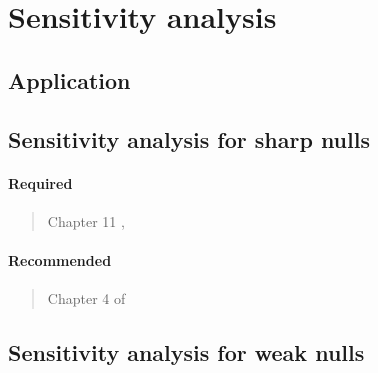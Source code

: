 \documentclass[12pt]{article}
\begin{document}
\section{Sensitivity analysis}

\subsection*{Application}

\begin{verse}  \end{verse}

\subsection{Sensitivity analysis for sharp nulls}

\paragraph*{Required}

\begin{verse}
  Chapter 11 , 
\end{verse}

\paragraph*{Recommended}

\begin{verse} Chapter 4 of  \end{verse}

\begin{verse}  \end{verse}

\begin{verse}  \end{verse}

\begin{verse}  \end{verse}

\begin{verse}  \end{verse}

\subsection{Sensitivity analysis for weak nulls}
\end{document}
